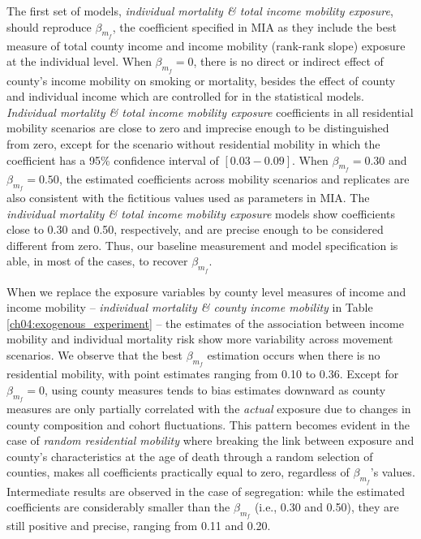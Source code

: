 \documentclass[class=article, crop=false, 12pt]{standalone}
\begin{document}
The first set of models, \textit{individual mortality \& total income mobility exposure}, should reproduce $\beta_{m_{f}}$, the coefficient specified in MIA as they include the best measure of total county income and income mobility (rank-rank slope) exposure at the individual level. When $\beta_{m_{f}} = 0$, there is no direct or indirect effect of county's income mobility on smoking or mortality, besides the effect of county and individual income which are controlled for in the statistical models. \textit{Individual mortality \& total income mobility exposure} coefficients in all residential mobility scenarios are close to zero and imprecise enough to be distinguished from zero, except for the scenario without residential mobility in which the coefficient has a 95\% confidence interval of $[0.03-0.09]$. When $\beta_{m_{f}} = 0.30$ and $\beta_{m_{f}} = 0.50$, the estimated coefficients across mobility scenarios and replicates are also consistent with the fictitious values used as parameters in MIA. The \textit{individual mortality \& total income mobility exposure} models show coefficients close to 0.30 and 0.50, respectively, and are precise enough to be considered different from zero. Thus, our baseline measurement and model specification is able, in most of the cases, to recover $\beta_{m_{f}}$.  

When we replace the exposure variables by county level measures of income and income mobility -- \textit{individual mortality \&  county income mobility} in Table \ref{ch04:exogenous_experiment} -- the estimates of the association between income mobility and individual mortality risk show more variability across movement scenarios. We observe that the best $\beta_{m_{f}}$ estimation occurs when there is no residential mobility, with point estimates ranging from 0.10 to 0.36. Except for $\beta_{m_{f}} = 0$, using county measures tends to bias estimates downward as county measures are only partially correlated with the 
\emph{actual} exposure due to changes in county composition and cohort fluctuations. This pattern becomes evident in the case of \textit{random residential mobility} where breaking the link between exposure and county's characteristics at the age of death through a random selection of counties, makes all coefficients practically equal to zero, regardless of $\beta_{m_{f}}$'s values. Intermediate results are observed in the case of segregation: while the estimated coefficients are considerably smaller than the $\beta_{m_{f}}$ (i.e., 0.30 and 0.50), they are still positive and precise, ranging from 0.11 and 0.20.
\end{document}
